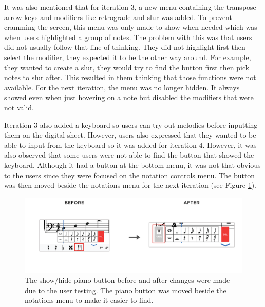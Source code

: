 			It was also mentioned that for iteration 3, a new menu containing the transpose arrow keys and modifiers like retrograde and slur was added. To prevent cramming the screen, this menu was only made to show when needed which was when users highlighted a group of notes. The problem with this was that users did not usually follow that line of thinking. They did not highlight first then select the modifier, they expected it to be the other way around. For example, they wanted to create a slur, they would try to find the button first then pick notes to slur after. This resulted in them thinking that those functions were not available. For the next iteration, the menu was no longer hidden. It always showed even when just hovering on a note but disabled the modifiers that were not valid. 

			Iteration 3 also added a keyboard so users can try out melodies before inputting them on the digital sheet. However, users also expressed that they wanted to be able to input from the keyboard so it was added for iteration 4. However, it was also observed that some users were not able to find the button that showed the keyboard. Although it had a button at the bottom menu, it was not that obvious to the users since they were focused on the notation controls menu. The button was then moved beside the notations menu for the next iteration (see Figure \ref{fig:before-after-pianobtn}). 

			\begin{figure}[h]
				\centering
				\includegraphics[scale=0.273]{figures/before-after-pianobtn.png}
			    \caption{The show/hide piano button before and after changes were made due to the user testing. The piano button was moved beside the notations menu to make it easier to find.}
			    \label{fig:before-after-pianobtn}
			\end{figure}

